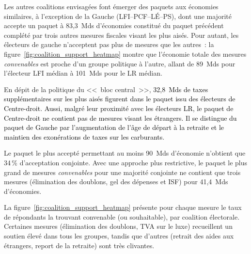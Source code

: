 \documentclass[12pt,french]{article}
\newcommand{\blue}[1]{\textcolor{black}{#1}} %
\begin{document}
Les autres coalitions envisagées font émerger des paquets aux économies similaires, à l'exception de la Gauche (LFI--PCF--LÉ--PS), dont une majorité accepte un paquet à 83,3~Mds d'économies constitué du paquet précédent complété par trois autres mesures fiscales visant les plus aisés. Pour autant, les électeurs de gauche n'acceptent pas plus de mesures que les autres~: la figure~\ref{fig:coalition_support_heatmap} montre que l'économie totale des mesures \textit{convenables} est proche d'un groupe politique à l'autre, allant de 89~Mds pour l'électeur LFI médian à 101~Mds pour le LR médian.

En dépit de la politique du <<~bloc central~>>, \blue{32,8~Mds de taxes supplémentaires sur les plus aisés figurent dans le paquet issu des électeurs de Centre-droit. Aussi, malgré leur proximité avec les électeurs LR, le paquet de Centre-droit ne contient pas de mesures visant les étrangers. Il se distingue du paquet de Gauche par l'augmentation de l'âge de départ à la retraite et le maintien des exonérations de taxes sur les carburants}.


Le paquet le plus accepté permettant au moins 90~Mds d'économie n'obtient que 34\,\% d'acceptation conjointe. Avec une approche plus restrictive, le paquet le plus grand de mesures \textit{convenables} pour une majorité conjointe ne contient que trois mesures (élimination des doublons, gel des dépenses et ISF) pour 41,4~Mds d'économies. 



La figure~\ref{fig:coalition_support_heatmap} présente pour chaque mesure le taux de répondants la trouvant convenable (ou souhaitable), par coalition électorale. Certaines mesures (élimination des doublons, TVA sur le luxe) recueillent un soutien élevé dans tous les groupes, tandis que d'autres (retrait des aides aux étrangers, report de la retraite) sont très clivantes.
\end{document}

